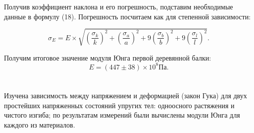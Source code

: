 \documentclass[a4paper,12pt]{report}
\begin{document}
Получив коэффициент наклона и его погрешность, подставим необходимые данные в формулу (18). Погрешность посчитаем как для степенной зависимости:

\[\sigma_E=E\times \sqrt{(\frac{\sigma_k}{k})^2+(\frac{\sigma_a}{a})^2+9(\frac{\sigma_b}{b})^2+9(\frac{\sigma_l}{l})^2}. \]

Получим итоговое значение модуля Юнга первой деревянной балки:
	\[E = (447\pm38)\times 10^8  \textbf{Па}. \]
	
\section*{\center{}}

Изучена зависимость между напряжением и деформацией (закон Гука) для двух простейших напряженных состояний упругих тел: одноосного растяжения и чистого изгиба; по результатам измерений были вычислены модули Юнга для каждого из материалов.  
	
\end{document}
